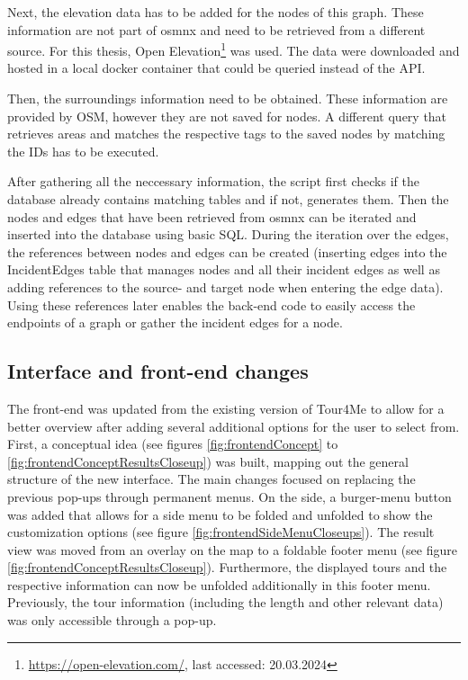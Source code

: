Next, the elevation data has to be added for the nodes of this graph.
These information are not part of osmnx and need to be retrieved from a different source.
For this thesis, Open Elevation\footnote{\url{https://open-elevation.com/}, last accessed: 20.03.2024} was used.
The data were downloaded and hosted in a local docker container that could be queried instead of the API.

Then, the surroundings information need to be obtained. 
These information are provided by OSM, however they are not saved for nodes.
A different query that retrieves areas and matches the respective tags to the saved nodes by matching the IDs has to be executed.

After gathering all the neccessary information, the script first checks if the database already contains matching tables and if not, generates them.
Then the nodes and edges that have been retrieved from osmnx can be iterated and inserted into the database using basic SQL.
During the iteration over the edges, the references between nodes and edges can be created (inserting edges into the IncidentEdges table that manages nodes and all their incident edges as well as adding references to the source- and target node when entering the edge data).
Using these references later enables the back-end code to easily access the endpoints of a graph or gather the incident edges for a node. 



\subsection{Interface and front-end changes}
\label{subsec:interfaceAndFrontendChanges}

The front-end was updated from the existing version of Tour4Me to allow for a better overview after adding several additional options for the user to select from. 
First, a conceptual idea (see figures \ref{fig:frontendConcept} to \ref{fig:frontendConceptResultsCloseup}) was built, mapping out the general structure of the new interface. 
The main changes focused on replacing the previous pop-ups through permanent menus.
On the side, a burger-menu button was added that allows for a side menu to be folded and unfolded to show the customization options (see figure \ref{fig:frontendSideMenuCloseups}). 
The result view was moved from an overlay on the map to a foldable footer menu (see figure \ref{fig:frontendConceptResultsCloseup}). 
Furthermore, the displayed tours and the respective information can now be unfolded additionally in this footer menu.
Previously, the tour information (including the length and other relevant data) was only accessible through a pop-up. 

